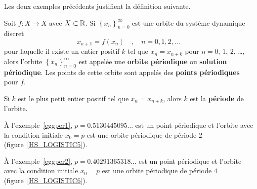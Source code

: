 {Les deux exemples précédents justifient la définition suivante.

\begin{focus}{\dfn}
Soit $f:X \to X$ avec $X \subset \mathbb{R}$.  Si
$\displaystyle \left\{ x_n \right\}_{n=0}^\infty$ est une orbite du
système dynamique discret
\[
x_{n+1} = f(x_n) \quad , \quad n=0, 1, 2, \ldots
\]
pour laquelle il existe un entier positif $k$ tel que $x_n = x_{n+k}$
pour $n=0$, $1$, $2$, \ldots, alors l'orbite 
$\displaystyle \left\{ x_n \right\}_{n=0}^\infty$ est appelée une
{\bfseries orbite périodique}
ou {\bfseries solution périodique}.  Les
points de cette orbite sont appelés des
{\bfseries points périodiques} pour $f$.

Si $k$ est le plus petit entier positif tel que $x_n = x_{n+k}$, alors
$k$ est la {\bfseries période} de l'orbite.
\end{focus}

\begin{egg}
À l'exemple~\ref{eggper1}, $p=0.5130445095\ldots$ est un point
périodique et l'orbite avec la condition initiale $x_0=p$ est une
orbite périodique de période $2$ (figure~\ref{HS_LOGISTIC5}).

À l'exemple~\ref{eggper2}, $p=0.40291365318\ldots$ est un point
périodique et l'orbite avec la condition initiale $x_0=p$ est une
orbite périodique de période $4$ (figure~\ref{HS_LOGISTIC6}).
\end{egg}

}
